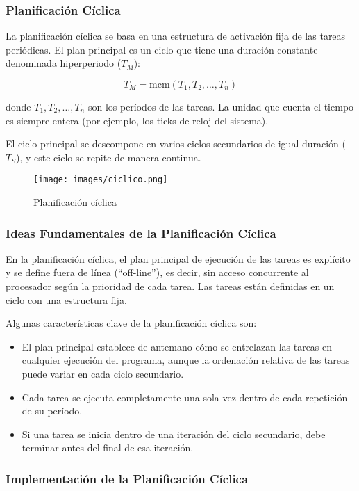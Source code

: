 \documentclass[a4paper,12pt]{article}
\begin{document}
\subsubsection{Planificación Cíclica}

La planificación cíclica se basa en una estructura de activación fija de las tareas periódicas. El plan principal es un ciclo que tiene una duración constante denominada hiperperiodo (\(T_M\)):

\[
T_M = \text{mcm}(T_1, T_2, \dots, T_n)
\]

donde \(T_1, T_2, \dots, T_n\) son los períodos de las tareas. La unidad que cuenta el tiempo es siempre entera (por ejemplo, los ticks de reloj del sistema).

El ciclo principal se descompone en varios ciclos secundarios de igual duración (\(T_S\)), y este ciclo se repite de manera continua.

\begin{figure}[H]
    \centering
    \texttt{[image: images/ciclico.png]}
    \caption{Planificación cíclica}
    \label{fig:ciclico}
\end{figure}

\subsubsection{Ideas Fundamentales de la Planificación Cíclica}

En la planificación cíclica, el plan principal de ejecución de las tareas es explícito y se define fuera de línea (``off-line''), es decir, sin acceso concurrente al procesador según la prioridad de cada tarea. Las tareas están definidas en un ciclo con una estructura fija.

Algunas características clave de la planificación cíclica son:
\begin{itemize}
    \item El plan principal establece de antemano cómo se entrelazan las tareas en cualquier ejecución del programa, aunque la ordenación relativa de las tareas puede variar en cada ciclo secundario.
    \item Cada tarea se ejecuta completamente una sola vez dentro de cada repetición de su período.
    \item Si una tarea se inicia dentro de una iteración del ciclo secundario, debe terminar antes del final de esa iteración.
\end{itemize}

\subsubsection{Implementación de la Planificación Cíclica}
\end{document}
